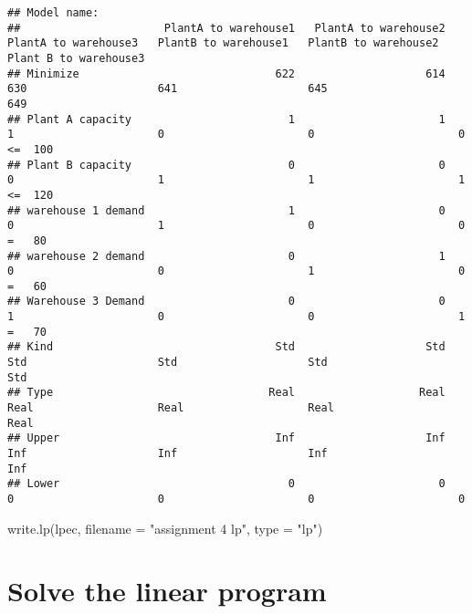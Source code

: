 \documentclass[
]{article}
\newenvironment{Shaded}{\begin{snugshade}}{\end{snugshade}}
\newcommand{\AttributeTok}[1]{\textcolor[rgb]{0.77,0.63,0.00}{#1}}
\newcommand{\FunctionTok}[1]{\textcolor[rgb]{0.00,0.00,0.00}{#1}}
\newcommand{\NormalTok}[1]{#1}
\newcommand{\StringTok}[1]{\textcolor[rgb]{0.31,0.60,0.02}{#1}}
\begin{document}
\begin{verbatim}
## Model name: 
##                      PlantA to warehouse1   PlantA to warehouse2   PlantA to warehouse3   PlantB to warehouse1   PlantB to warehouse2  Plant B to warehouse3         
## Minimize                              622                    614                    630                    641                    645                    649         
## Plant A capacity                        1                      1                      1                      0                      0                      0  <=  100
## Plant B capacity                        0                      0                      0                      1                      1                      1  <=  120
## warehouse 1 demand                      1                      0                      0                      1                      0                      0   =   80
## warehouse 2 demand                      0                      1                      0                      0                      1                      0   =   60
## Warehouse 3 Demand                      0                      0                      1                      0                      0                      1   =   70
## Kind                                  Std                    Std                    Std                    Std                    Std                    Std         
## Type                                 Real                   Real                   Real                   Real                   Real                   Real         
## Upper                                 Inf                    Inf                    Inf                    Inf                    Inf                    Inf         
## Lower                                   0                      0                      0                      0                      0                      0
\end{verbatim}

\begin{Shaded}
\begin{Highlighting}[]
\FunctionTok{write.lp}\NormalTok{(lpec, }\AttributeTok{filename =} \StringTok{"assignment 4 lp"}\NormalTok{, }\AttributeTok{type =} \StringTok{"lp"}\NormalTok{)}
\end{Highlighting}
\end{Shaded}

\hypertarget{solve-the-linear-program}{%
\section{Solve the linear program}\label{solve-the-linear-program}}
\end{document}
